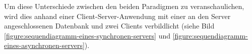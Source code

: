 \begin{table}[h]
    \caption{Vergleich zwischen synchroner und asynchroner Ausführung}
    \label{tab:vergleich-synchroner-asynchroner-Ausfuehrung}
\end{table}

Um diese Unterschiede zwischen den beiden Paradigmen zu veranschaulichen, wird dies anhand einer Client-Server-Anwendung mit einer an den Server angeschlossenen Datenbank und zwei Clients verbildlicht (siehe Bild \ref{figure:sequendiagramm-eines-synchronen-servers} und \ref{figure:sequendiagramm-eines-asynchronen-servers}).


